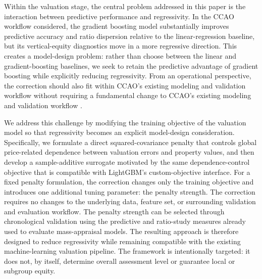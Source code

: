 \documentclass[10pt]{article}
\theoremstyle{definition}
\newcommand{\1}{\mathbf{1}}
\begin{document}
Within the valuation stage, the central problem addressed in this paper is the interaction between predictive performance and {regressivity}. In the CCAO workflow considered, the gradient boosting model substantially improves predictive accuracy and ratio dispersion relative to {the linear-regression baseline}, but its vertical-equity diagnostics move in a more regressive direction. {This creates a model-design problem: rather than choose between the linear and gradient-boosting baselines, we seek to retain the predictive advantage of gradient boosting while explicitly reducing regressivity.} From an operational perspective, {the correction should also fit within CCAO's existing modeling and validation workflow without requiring} a fundamental change to CCAO's existing modeling and validation workflow \cite{CCAOModelResAVM2026}.


We address this challenge by modifying the training objective of the valuation model so that {regressivity} becomes an explicit model-design consideration. {Specifically, we formulate a direct squared-covariance penalty that controls global price-related dependence between valuation errors and property values, and then develop a sample-additive surrogate motivated by the same dependence-control objective that is compatible with LightGBM's custom-objective interface.} {For a fixed penalty formulation, the correction changes only the training objective and introduces one additional tuning parameter: the penalty strength.} The correction requires no changes to the underlying data, feature set, or surrounding validation and evaluation workflow. The {penalty strength} can be selected through chronological validation using the predictive and ratio-study measures already used to evaluate mass-appraisal models. The resulting approach is therefore designed to reduce regressivity while remaining compatible with the existing machine-learning valuation pipeline. {The framework is intentionally targeted: it does not, by itself, determine overall assessment level or guarantee local or subgroup equity.}
\end{document}
